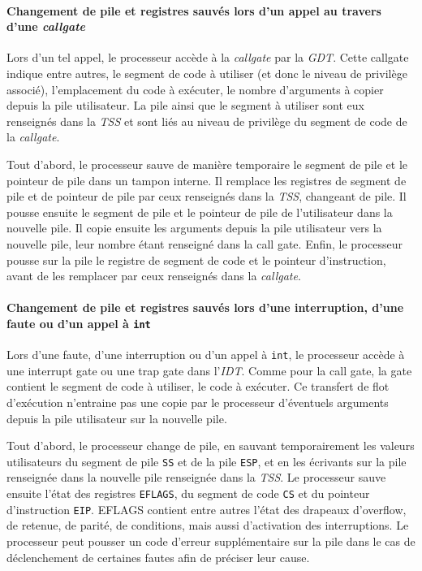 \paragraph{Changement de pile et registres sauvés lors d'un appel au travers d'une \emph{callgate}}
\label{sec:intel_callgate}

Lors d'un tel appel, le processeur accède à la \emph{callgate} par la \emph{GDT}. Cette callgate indique entre autres, le segment de code à utiliser (et donc le niveau de privilège associé), l'emplacement du code à exécuter, le nombre d'arguments à copier depuis la pile utilisateur. La pile ainsi que le segment à utiliser sont eux renseignés dans la \emph{TSS} et sont liés au niveau de privilège du segment de code de la \emph{callgate}.

Tout d'abord, le processeur sauve de manière temporaire le segment de pile et le pointeur de pile dans un tampon interne. Il remplace les registres de segment de pile et de pointeur de pile par ceux renseignés dans la \emph{TSS}, changeant de pile. Il pousse ensuite le segment de pile et le pointeur de pile de l'utilisateur dans la nouvelle pile. Il copie ensuite les arguments depuis la pile utilisateur vers la nouvelle pile, leur nombre étant renseigné dans la call gate. Enfin, le processeur pousse sur la pile le registre de segment de code et le pointeur d'instruction, avant de les remplacer par ceux renseignés dans la \emph{callgate}.

\paragraph{Changement de pile et registres sauvés lors d'une interruption, d'une faute ou d'un appel à \texttt{int}}
\label{intel_hard_context}
Lors d'une faute, d'une interruption ou d'un appel à \texttt{int}, le processeur accède à une interrupt gate ou une trap gate dans l'\emph{IDT}. Comme pour la call gate, la gate contient le segment de code à utiliser, le code à exécuter. Ce transfert de flot d'exécution n'entraine pas une copie par le processeur d'éventuels arguments depuis la pile utilisateur sur la nouvelle pile.

Tout d'abord, le processeur change de pile, en sauvant temporairement les valeurs utilisateurs du segment de pile \texttt{SS} et de la pile \texttt{ESP}, et en les écrivants sur la pile renseignée dans la nouvelle pile renseignée dans la \emph{TSS}. Le processeur sauve ensuite l'état des registres \texttt{EFLAGS}, du segment de code \texttt{CS} et du pointeur d'instruction \texttt{EIP}. EFLAGS contient entre autres l'état des drapeaux d'overflow, de retenue, de parité, de conditions, mais aussi d'activation des interruptions. Le processeur peut pousser un code d'erreur supplémentaire sur la pile dans le cas de déclenchement de certaines fautes afin de préciser leur cause.

